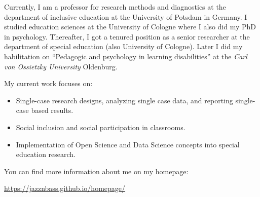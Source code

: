 \documentclass[
  letterpaper,
  DIV=11,
  numbers=noendperiod]{scrreprt}
\providecommand{\tightlist}{%
  \setlength{\itemsep}{0pt}\setlength{\parskip}{0pt}}\usepackage{longtable,booktabs,array}
\begin{document}
Currently, I am a professor for research methods and diagnostics at the
department of inclusive education at the University of Potsdam in
Germany. I studied education sciences at the University of Cologne where
I also did my PhD in psychology. Thereafter, I got a tenured position as
a senior researcher at the department of special education (also
University of Cologne). Later I did my habilitation on ``Pedagogic and
psychology in learning disabilities'' at the \emph{Carl von Ossietzky
University} Oldenburg.

My current work focuses on:

\begin{itemize}
\tightlist
\item
  Single-case research designs, analyzing single case data, and
  reporting single-case based results.
\item
  Social inclusion and social participation in classrooms.
\item
  Implementation of Open Science and Data Science concepts into special
  education research.
\end{itemize}

You can find more information about me on my homepage:

\url{https://jazznbass.github.io/homepage/}
\end{document}
